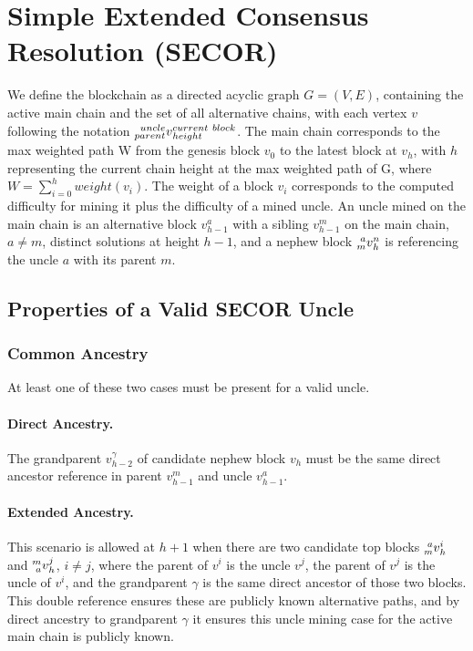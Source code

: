 \documentclass{article}
\begin{document}
\section{Simple Extended Consensus Resolution (SECOR)}
We define the blockchain as a directed acyclic graph $G = (V, E)$, containing the active main chain and the set of all alternative chains, with each vertex $v$ following the notation $\prescript{uncle}{parent}v_{height}^{current\ block}$. The main chain corresponds to the max weighted path W from the genesis block $v_0$ to the latest block at $v_h$, with $h$ representing the current chain height at the max weighted path of G, where $W = \sum_{i=0}^{h} weight(v_i)$. The weight of a block $v_i$ corresponds to the computed difficulty for mining it plus the difficulty of a mined uncle. An uncle mined on the main chain is an alternative block $v_{h-1}^a$ with a sibling $v_{h-1}^m$ on the main chain, $a \neq m$, distinct solutions at height $h-1$, and a nephew block $\prescript{a}{m}v_h^n$ is referencing the uncle $a$ with its parent $m$.
\subsection{Properties of a Valid SECOR Uncle}
\subsubsection{Common Ancestry}
At least one of these two cases must be present for a valid uncle.

\paragraph{Direct Ancestry.}
The grandparent $v_{h-2}^{\gamma}$ of candidate nephew block $v_h$ must be the same direct ancestor reference in parent $v_{h-1}^m$ and uncle $v_{h-1}^a$.
\paragraph{Extended Ancestry.}
This scenario is allowed at $h+1$ when there are two candidate top blocks $\prescript{a}{m}v_h^i$ and $\prescript{m}{a}v_h^j$, $i \neq j$, where the parent of $v^i$ is the uncle $v^j$, the parent of $v^j$ is the uncle of $v^i$, and the grandparent $\gamma$ is the same direct ancestor of those two blocks. This double reference ensures these are publicly known alternative paths, and by direct ancestry to grandparent $\gamma$ it ensures this uncle mining case for the active main chain is publicly known.
\end{document}
